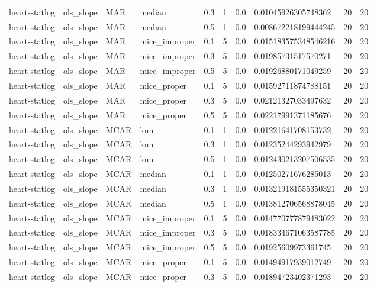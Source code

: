 \begin{tabular}{llllllllll}
heart-statlog & ols\_slope & MAR & median & 0.3 & 1 & 0.0 & 0.01045926305748362 & 20 & 20 \\
heart-statlog & ols\_slope & MAR & median & 0.5 & 1 & 0.0 & 0.008672218199444245 & 20 & 20 \\
heart-statlog & ols\_slope & MAR & mice\_improper & 0.1 & 5 & 0.0 & 0.015183575348546216 & 20 & 20 \\
heart-statlog & ols\_slope & MAR & mice\_improper & 0.3 & 5 & 0.0 & 0.01985731517570271 & 20 & 20 \\
heart-statlog & ols\_slope & MAR & mice\_improper & 0.5 & 5 & 0.0 & 0.01926880171049259 & 20 & 20 \\
heart-statlog & ols\_slope & MAR & mice\_proper & 0.1 & 5 & 0.0 & 0.01592711874788151 & 20 & 20 \\
heart-statlog & ols\_slope & MAR & mice\_proper & 0.3 & 5 & 0.0 & 0.02121327033497632 & 20 & 20 \\
heart-statlog & ols\_slope & MAR & mice\_proper & 0.5 & 5 & 0.0 & 0.02217991371185676 & 20 & 20 \\
heart-statlog & ols\_slope & MCAR & knn & 0.1 & 1 & 0.0 & 0.01221641708153732 & 20 & 20 \\
heart-statlog & ols\_slope & MCAR & knn & 0.3 & 1 & 0.0 & 0.01235244293942979 & 20 & 20 \\
heart-statlog & ols\_slope & MCAR & knn & 0.5 & 1 & 0.0 & 0.012430213207506535 & 20 & 20 \\
heart-statlog & ols\_slope & MCAR & median & 0.1 & 1 & 0.0 & 0.01250271676285013 & 20 & 20 \\
heart-statlog & ols\_slope & MCAR & median & 0.3 & 1 & 0.0 & 0.013219181555350321 & 20 & 20 \\
heart-statlog & ols\_slope & MCAR & median & 0.5 & 1 & 0.0 & 0.013812706568878045 & 20 & 20 \\
heart-statlog & ols\_slope & MCAR & mice\_improper & 0.1 & 5 & 0.0 & 0.014770777879483022 & 20 & 20 \\
heart-statlog & ols\_slope & MCAR & mice\_improper & 0.3 & 5 & 0.0 & 0.018334671063587785 & 20 & 20 \\
heart-statlog & ols\_slope & MCAR & mice\_improper & 0.5 & 5 & 0.0 & 0.01925609973361745 & 20 & 20 \\
heart-statlog & ols\_slope & MCAR & mice\_proper & 0.1 & 5 & 0.0 & 0.01494917939012749 & 20 & 20 \\
heart-statlog & ols\_slope & MCAR & mice\_proper & 0.3 & 5 & 0.0 & 0.01894723402371293 & 20 & 20 \\

\end{tabular}
